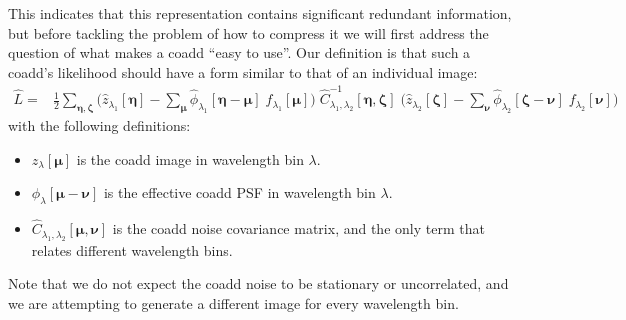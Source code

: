 \documentclass[DM,authoryear,toc]{lsstdoc}
\begin{document}
This indicates that this representation contains significant redundant information, but before tackling the problem of how to compress it we will first address the question of what makes a coadd ``easy to use''.
Our definition is that such a coadd's likelihood should have a form similar to that of an individual image:
\begin{align}
\hat{L} =&
    \frac{1}{2}\sum_{\bm{\eta},\bm{\zeta}}
    \bigg(
        \hat{z}_{\lambda_1}[\bm{\eta}]
        - \sum_{\bm{\mu}}\hat{\phi}_{\lambda_1}[\bm{\eta}-\bm{\mu}]
        \; f_{\lambda_1}[\bm{\mu}]
    \bigg)
    \; \hat{C}^{-1}_{\lambda_1,\lambda_2}[\bm{\eta},\bm{\zeta}]
    \; \bigg(
        \hat{z}_{\lambda_2}[\bm{\zeta}]
        - \sum_{\bm{\nu}}\hat{\phi}_{\lambda_2}[\bm{\zeta}-\bm{\nu}]
        \; f_{\lambda_2}[\bm{\nu}]
    \bigg)
    \label{eqn:natural-coadd-likelihood}
\end{align}
with the following definitions:
\begin{itemize}
    \item $z_{\lambda}[\bm{\mu}]$ is the coadd image in wavelength bin $\lambda$.
    \item $\phi_{\lambda}[\bm{\mu}-\bm{\nu}]$ is the effective coadd PSF in wavelength bin $\lambda$.
    \item $\hat{C}_{\lambda_1,\lambda_2}[\bm{\mu},\bm{\nu}]$ is the coadd noise covariance matrix, and the only term that relates different wavelength bins.
\end{itemize}
Note that we do not expect the coadd noise to be stationary or uncorrelated, and we are attempting to generate a different image for every wavelength bin.
\end{document}
